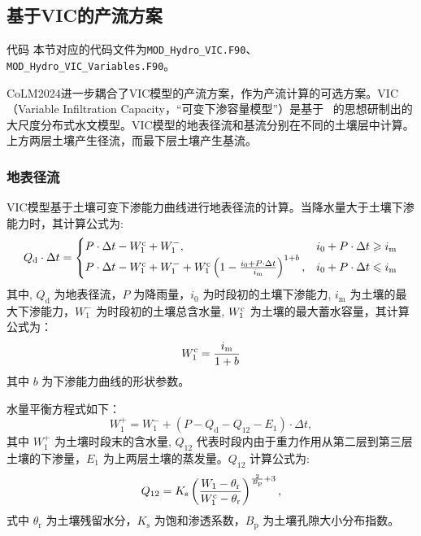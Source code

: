 \subsection{基于VIC的产流方案}
\begin{mymdframed}{代码}
  本节对应的代码文件为\texttt{MOD\_Hydro\_VIC.F90}、\texttt{MOD\_Hydro\_VIC\_Variables.F90}。
\end{mymdframed}

CoLM2024进一步耦合了VIC模型的产流方案，作为产流计算的可选方案。VIC（Variable Infiltration Capacity，“可变下渗容量模型”）是基于~\citet{liang1994simple} 的思想研制出的大尺度分布式水文模型。VIC模型的地表径流和基流分别在不同的土壤层中计算。上方两层土壤产生径流，而最下层土壤产生基流。

\subsubsection{地表径流}

    VIC模型基于土壤可变下渗能力曲线进行地表径流的计算。当降水量大于土壤下渗能力时，其计算公式为:
    \begin{equation}
      Q_{\mathrm {d}} \cdot\Delta t=
      \begin{cases}
        P\cdot\Delta t - W_1^{\rm c} + W_1^-, & i_0 + P\cdot\Delta t \geqslant i_{\mathrm {m}}  \\
        P\cdot\Delta t - W_1^{\rm c} + W_1^- + W_1^{\rm c} \left(1-\frac{i_0+P\cdot\Delta t}{i_{\mathrm {m}} } \right)^{1+b}, & i_0 + P\cdot\Delta t \leqslant i_{\mathrm {m}}
      \end{cases}
    \end{equation}
    其中, $Q_{\mathrm {d}} $ 为地表径流，$P$ 为降雨量，$i_0$ 为时段初的土壤下渗能力, $i_{\mathrm {m}} $ 为土壤的最大下渗能力，$W_1^-$ 为时段初的土壤总含水量, $W_1^{\rm c}$ 为土壤的最大蓄水容量，其计算公式为：
    \begin{equation}
      W_1^{\rm c} = \frac{i_{\mathrm {m}} }{1+b}
    \end{equation}
    其中 $b$ 为下渗能力曲线的形状参数。

    水量平衡方程式如下：
    \begin{equation}
      W_1^+ = W_1^- + (P - Q_{\mathrm {d}}  - Q_{12} - E_1)\cdot\Delta t,
    \end{equation}
    其中 $W_1^+$ 为土壤时段末的含水量, $Q_{12}$ 代表时段内由于重力作用从第二层到第三层土壤的下渗量，$E_1$ 为上两层土壤的蒸发量。$Q_{12}$ 计算公式为:
    \begin{equation}
      Q_{12} = K_{\mathrm {s}}  \left(\frac{W_1-\theta_{\mathrm {r}} }{W_1^{\rm c}-\theta_{\mathrm {r}} }\right)^{\frac{2}{B_{\mathrm {p}} } + 3},
    \end{equation}
    式中 $\theta_{\mathrm {r}} $ 为土壤残留水分，$K_{\mathrm {s}} $ 为饱和渗透系数，$B_{\mathrm {p}} $ 为土壤孔隙大小分布指数。

